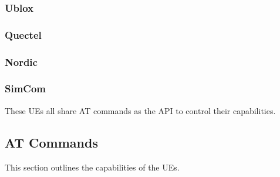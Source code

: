 \documentclass[]{article}
\begin{document}
\hypertarget{ublox}{%
\subsubsection{Ublox}\label{ublox}}

\hypertarget{quectel}{%
\subsubsection{Quectel}\label{quectel}}

\hypertarget{nordic}{%
\subsubsection{Nordic}\label{nordic}}

\hypertarget{simcom}{%
\subsubsection{SimCom}\label{simcom}}

These UEs all share AT commands as the API to control their
capabilities.

\hypertarget{atcommands}{%
\subsection{AT Commands}\label{atcommands}}

This section outlines the capabilities of the UEs.
\end{document}
